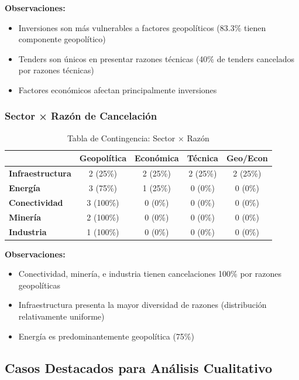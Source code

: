 \documentclass[12pt]{article}
\begin{document}
\textbf{Observaciones:}
\begin{itemize}
    \item Inversiones son más vulnerables a factores geopolíticos (83.3\% tienen componente geopolítico)
    \item Tenders son únicos en presentar razones técnicas (40\% de tenders cancelados por razones técnicas)
    \item Factores económicos afectan principalmente inversiones
\end{itemize}

\subsubsection{Sector × Razón de Cancelación}

\begin{table}[H]
\centering
\caption{Tabla de Contingencia: Sector × Razón}
\label{tab:sector_razon}
\scriptsize
\begin{tabular}{lcccc}
\toprule
 & \textbf{Geopolítica} & \textbf{Económica} & \textbf{Técnica} & \textbf{Geo/Econ} \\
\midrule
\textbf{Infraestructura} & 2 (25\%) & 2 (25\%) & 2 (25\%) & 2 (25\%) \\
\textbf{Energía} & 3 (75\%) & 1 (25\%) & 0 (0\%) & 0 (0\%) \\
\textbf{Conectividad} & 3 (100\%) & 0 (0\%) & 0 (0\%) & 0 (0\%) \\
\textbf{Minería} & 2 (100\%) & 0 (0\%) & 0 (0\%) & 0 (0\%) \\
\textbf{Industria} & 1 (100\%) & 0 (0\%) & 0 (0\%) & 0 (0\%) \\
\bottomrule
\end{tabular}
\end{table}

\textbf{Observaciones:}
\begin{itemize}
    \item Conectividad, minería, e industria tienen cancelaciones 100\% por razones geopolíticas
    \item Infraestructura presenta la mayor diversidad de razones (distribución relativamente uniforme)
    \item Energía es predominantemente geopolítica (75\%)
\end{itemize}

\subsection{Casos Destacados para Análisis Cualitativo}
\end{document}
